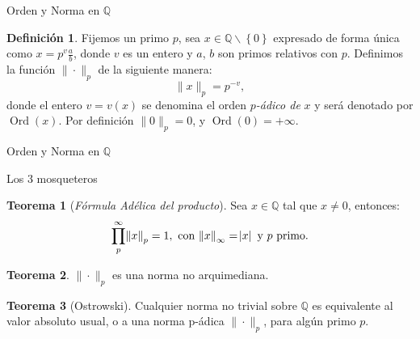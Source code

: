\documentclass{beamer}
\newcommand{\bb}[1]{\mathbb{#1}}
\theoremstyle{definition}
\numberwithin{equation}{section}
\newcommand{\marine}[1]{\textcolor{defColor}{#1}}
\newcommand{\orangee}[1]{\textcolor{thColor}{#1}}
\newtheorem{df}{\marine{Definición}}
\newtheorem{thh}{\orangee{Teorema}}
\newcommand{\tit}[1]{\textit{#1}}
\newcommand{\Q}{\mathbb{Q}}
\newcommand{\pnorm}[1]{\|#1\|_p}
\DeclareMathOperator{\ord}{Ord}
\begin{document}
\begin{frame}{Orden y Norma en $\Q$}
\begin{df} \label{ord_def_1}
	Fijemos un primo $p$, sea $x\in\mathbb{Q\smallsetminus}\left\{  0\right\}  $ expresado de forma única como $x=p^{v}\frac{a}{b}$, donde $v$ es un entero y
	$a$, $b$ son  primos relativos con $p$.
	Definimos la función $\pnorm{\cdot}$ de la siguiente manera:
	\[
	\| x\| _{p}=p^{-v},
	\]
	donde el entero $v=v\left (  x\right)  $ se denomina el orden $p$\textit{-ádico de} $x$ y
	será denotado por $\ord\left (  x\right)  $. Por definición $\|0\|_p=0$, y  $\ord (0)=+\infty $.
\end{df}
\end{frame}
\begin{frame}{Orden y Norma en $\Q$}
	 \begin{center}
	\end{center}
\end{frame}
\begin{frame}{Los 3 mosqueteros}
	
	\begin{thh}
		[\tit{Fórmula Adélica del producto}]
		Sea $x\in \bb{Q}$ tal que $x\neq0$, entonces:
		$$\displaystyle\prod_{p}^\infty \norm{x}_p=1, \text{ con } \norm{x}_\infty=\abs{x} \text{ y $p$ primo}.$$
	\end{thh}
\begin{thh}
		$\| \cdot \|_p$ es una norma no arquimediana.	
\end{thh}
\begin{thh}
	[Ostrowski]	\label{ostrowsky} Cualquier norma no trivial sobre $\mathbb{Q}$ es equivalente al
	valor absoluto usual, o a una norma p-ádica $\| \cdot\| _{p}%
	$, para algún primo $p$.
\end{thh}
\end{frame}
\end{document}
